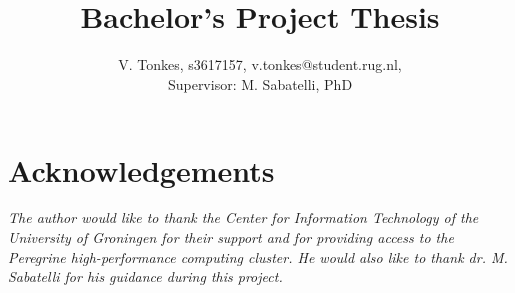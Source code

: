 \documentclass[10pt,a4paper,twocolumn]{article}
\title{\vspace{-0.5in}{\bfseries\scshape 
    Transferability of Vision Transformers: The key to success on small art classification datasets?%
    } \\ 
    \vspace{1ex} 
    \normalsize{Bachelor's Project Thesis}\vspace{-2ex}
}
\author{
    \normalsize{V. Tonkes, s3617157, v.tonkes@student.rug.nl,} \\ 
    \normalsize{Supervisor: M. Sabatelli, PhD}
}
\date{\vspace{-5ex}}
\begin{document}
\twocolumn[
  \maketitle
  \begin{@twocolumnfalse}
   
  \end{@twocolumnfalse}
]

\thispagestyle{firststyle}






\section*{Acknowledgements}
\textit{The author would like to thank {the Center for Information Technology of the University of Groningen} for their support and for providing access to the Peregrine high-performance computing cluster. He would also like to thank {dr. M. Sabatelli} for his guidance during this project.}






%    
%    
\end{document}
